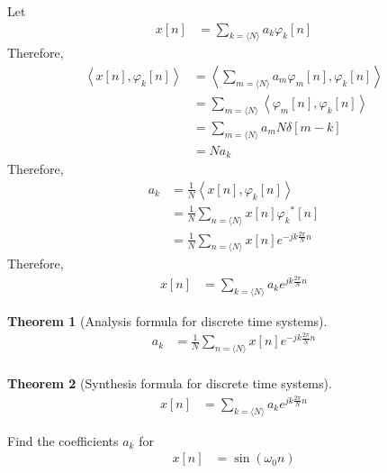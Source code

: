 \documentclass[titlepage, fleqn, a4paper, 12pt, twoside]{article}
\theoremstyle{definition}
\theoremstyle{theorem}
\newtheorem{theorem}{Theorem}
\begin{document}
Let
\begin{align*}
	x[n] &= \sum\limits_{k = \langle N \rangle} a_k \varphi_k[n]
\end{align*}
Therefore,
\begin{align*}
	\left\langle x[n],\varphi_k[n] \right\rangle &= \left\langle \sum\limits_{m = \langle N \rangle} a_m \varphi_m[n] , \varphi_k[n] \right\rangle\\
	&= \sum\limits_{m = \langle N \rangle} \left\langle \varphi_m[n],\varphi_k[n] \right\rangle\\
	&= \sum\limits_{m = \langle N \rangle} a_m N \delta[m - k]\\
	&= N a_k
\end{align*}
Therefore,
\begin{align*}
	a_k &= \frac{1}{N} \left\langle x[n],\varphi_k[n] \right\rangle\\
	&= \frac{1}{N} \sum\limits_{n = \langle N \rangle} x[n] {\varphi_k}^*[n]\\
	&= \frac{1}{N} \sum\limits_{n = \langle N \rangle} x[n] e^{-j k \frac{2 \pi}{N} n}
\end{align*}
Therefore,
\begin{align*}
	x[n] &= \sum\limits_{k = \langle N \rangle} a_k e^{j k \frac{2 \pi}{N} n}
\end{align*}

\begin{theorem}[Analysis formula for discrete time systems]
	\begin{align*}
		a_k &= \frac{1}{N} \sum\limits_{n = \langle N \rangle} x[n] e^{-j k \frac{2 \pi}{N} n}\\
	\end{align*}
\end{theorem}

\begin{theorem}[Synthesis formula for discrete time systems]
	\begin{align*}
		x[n] &= \sum\limits_{k = \langle N \rangle} a_k e^{j k \frac{2 \pi}{N} n}
	\end{align*}
\end{theorem}

\begin{question}
	Find the coefficients $a_k$ for
	\begin{align*}
		x[n] &= \sin(\omega_0 n)
	\end{align*}
\end{question}
\end{document}
